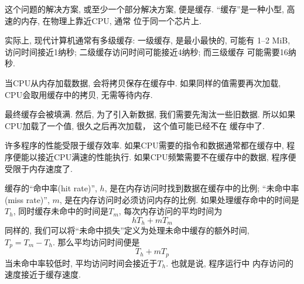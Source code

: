 \documentclass[12pt]{book}
\begin{document}
{这个问题的解决方案, 或至少一个部分解决方案, 便是缓存.
``缓存''是一种小型, 高速的内存, 在物理上靠近CPU, 通常
位于同一个芯片上. 


实际上, 现代计算机通常有多级缓存: 一级缓存, 是最小最快的, 可能有
1--2 MiB, 访问时间接近1纳秒; 二级缓存访问时间可能接近4纳秒; 而三级缓存
可能需要16纳秒.

当CPU从内存加载数据, 会将拷贝保存在缓存中. 
如果同样的值需要再次加载, CPU会取用缓存中的拷贝, 无需等待内存. 

最终缓存会被填满. 然后, 为了引入新数据, 我们需要先淘汰一些旧数据.
所以如果CPU加载了一个值, 很久之后再次加载， 这个值可能已经不在
缓存中了.

许多程序的性能受限于缓存效率. 如果CPU需要的指令和数据通常都在缓存中,
程序便能以接近CPU满速的性能执行. 如果CPU频繁需要不在缓存中的数据,
程序便受限于内存速度了.

缓存的``命中率(hit rate)'', $h$, 是在内存访问时找到数据在缓存中的比例;
``未命中率(miss rate)'', $m$, 是在内存访问时必须访问内存的比例.
如果处理缓存命中的时间是 $T_h$, 同时缓存未命中的时间是$T_m$, 
每次内存访问的平均时间为
%
\[ h T_h + m T_m \]
%
同样的, 我们可以将``未命中损失''定义为处理未命中缓存的额外时间, 
 $T_p = T_m - T_h$. 那么平均访问时间便是
%
\[ T_h + m T_p \]
%
当未命中率较低时, 平均访问时间会接近于$T_h$. 也就是说, 程序运行中
内存访问的速度接近于缓存速度.

}
\end{document}
